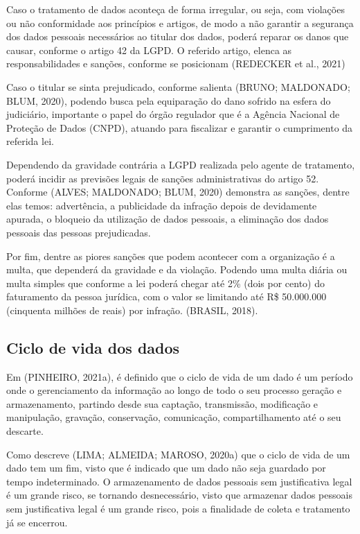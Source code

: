 \documentclass[
	12pt,				%
	openright,			%
	oneside,			%
	a4paper,			%
	english,			%
	french,				%
	spanish,			%
	brazil,				%
	]{abntex2}
\begin{document}
Caso o tratamento de dados aconteça de forma irregular, ou seja, com violações ou não conformidade aos princípios e artigos, de modo a não garantir a segurança dos dados pessoais necessários ao titular dos dados, poderá reparar os danos que causar, conforme o artigo 42 da LGPD. O referido artigo, elenca as responsabilidades e sanções, conforme se posicionam (REDECKER et al., 2021)

Caso o titular se sinta prejudicado, conforme salienta (BRUNO; MALDONADO; BLUM, 2020), podendo busca pela equiparação do dano sofrido na esfera do judiciário, importante o papel do órgão regulador que é a Agência Nacional de Proteção de Dados (CNPD), atuando para fiscalizar e garantir o cumprimento da referida lei.

Dependendo da gravidade contrária a LGPD realizada pelo agente de tratamento, poderá incidir as previsões legais de sanções administrativas do artigo 52. Conforme (ALVES; MALDONADO; BLUM, 2020) demonstra as sanções, dentre elas temos: advertência, a publicidade da infração depois de devidamente apurada, o bloqueio da utilização de dados pessoais, a eliminação dos dados pessoais das pessoas prejudicadas. 

Por fim, dentre as piores sanções que podem acontecer com a organização é a multa, que dependerá da gravidade e da violação. Podendo uma multa diária ou multa simples que conforme a lei poderá chegar até 2\% (dois por cento) do faturamento da pessoa jurídica, com o valor se limitando até R\$ 50.000.000 (cinquenta milhões de reais) por infração. (BRASIL, 2018).

\subsection{Ciclo de vida dos dados}

Em (PINHEIRO, 2021a), é definido que o ciclo de vida de um dado é um período onde o gerenciamento da informação ao longo de todo o seu processo geração e armazenamento, partindo desde sua captação, transmissão, modificação e manipulação, gravação, conservação, comunicação, compartilhamento até o seu descarte.

Como descreve (LIMA; ALMEIDA; MAROSO, 2020a) que o ciclo de vida de um dado tem um fim, visto que é indicado que um dado não seja guardado por tempo indeterminado. O armazenamento de dados pessoais sem justificativa legal é um grande risco, se tornando desnecessário, visto que armazenar dados pessoais sem justificativa legal é um grande risco, pois a finalidade de coleta e tratamento já se encerrou.
\end{document}
